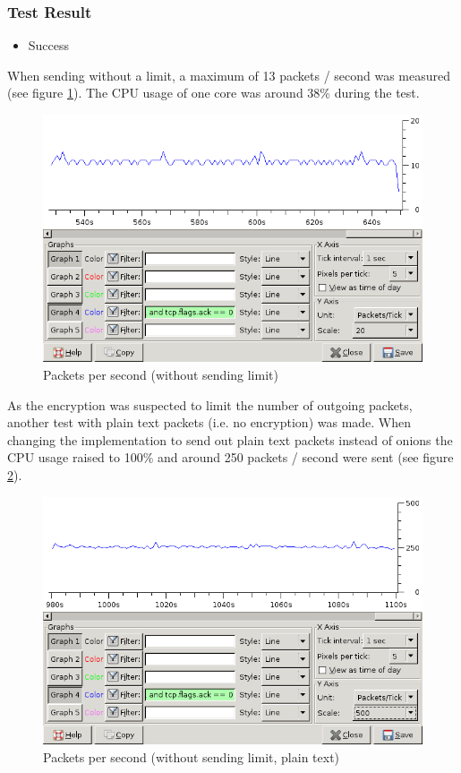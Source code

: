 \subsubsection{Test Result}
\begin{itemize}
\item Success
\end{itemize}
When sending without a limit, a maximum of 13 packets / second
was measured (see figure \ref{noisenolimit}). The CPU
usage of one core was around 38\% during the test.
\begin{figure}[htbp]
\caption{Packets per second (without sending limit)}
\label{noisenolimit}
\centering
\includegraphics[scale=0.5]{noise-no-limit.png}
\end{figure}
As the encryption was suspected to limit the number
of outgoing packets, another test with plain text
packets (i.e. no encryption) was made.
When changing the implementation to send out 
plain text packets instead of onions the
CPU usage raised to 100\% and
around 250 packets / second were sent (see figure
\ref{noisenolimitplain}).
\begin{figure}[htbp]
\caption{Packets per second (without sending limit, plain text)}
\label{noisenolimitplain}
\centering
\includegraphics[scale=0.5]{noise-plain-no-limit.png}
\end{figure}
